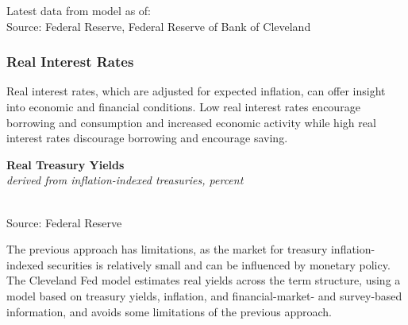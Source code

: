 \documentclass{report}
\newcommand{\tbllink}[1]{\href{https://raw.githubusercontent.com/bdecon/US-chartbook/master/chartbook/data/#1}{\faTable}}
\newcommand{\absnode}[3]{\node[below right, align=left] at (axis cs: #1,#2) {#3};}
\newcommand{\dateaxisticks}{
		date coordinates in=x, axis line style={draw=none},
		xmax={2023-10-01},
		max space between ticks=40,	    
		xtick={{1990-01-01}, {1992-01-01}, {1994-01-01}, 
			{1996-01-01}, {1998-01-01}, {2000-01-01}, 
			{2002-01-01}, {2004-01-01}, {2006-01-01},
			{2008-01-01}, {2010-01-01}, {2012-01-01}, {2014-01-01},
		    {2016-01-01}, {2018-01-01}, {2020-01-01}, {2022-01-01}, 
		    {2024-01-01}, {2026-01-01}},
		minor xtick={{1989-01-01}, {1991-01-01}, {1993-01-01},
			{1995-01-01}, {1997-01-01}, {1999-01-01}, 
			{2001-01-01}, {2003-01-01}, {2005-01-01}, {2007-01-01},
		    {2009-01-01}, {2011-01-01}, {2013-01-01}, {2015-01-01},
		    {2017-01-01}, {2019-01-01}, {2021-01-01}, {2023-01-01}, 
		    {2025-01-01}, {2027-01-01}},
		enlarge y limits={0.06}, enlarge x limits={0.01},
		}
\newcommand{\bbar}[2]{extra #1 ticks = {{#2}}, extra #1 tick labels = ,
		extra #1 tick style = {grid=major, grid style={thick, black!25}},}
\newcommand{\thickline}[4]{\addplot[ultra thick, no markers, color=#1] 
		table [x=#2, y=#3, col sep=comma] {#4};	}
\newcommand{\recbars}{
		\fill[color=black!10] (axis cs:{2007-12-01},\pgfkeysvalueof{/pgfplots/ymin}) rectangle 
			(axis cs:{2009-07-01}, \pgfkeysvalueof{/pgfplots/ymax});
		\fill[color=black!10] (axis cs:{2020-02-01},\pgfkeysvalueof{/pgfplots/ymin}) rectangle 
			(axis cs:{2020-05-01}, \pgfkeysvalueof{/pgfplots/ymax});}
\begin{document}
{\begin{minipage}{0.76\textwidth}
\footnotesize{Latest data from model as of: {}}\\
\footnotesize{Source: Federal Reserve, Federal Reserve of Bank of Cleveland} \hfill \tbllink{inf_exp_ch.csv}
\end{minipage}
\newpage
\begin{minipage}{0.76\textwidth}
\subsubsection*{Real Interest Rates}
\small  Real interest rates, which are adjusted for expected inflation, can offer insight into economic and financial conditions. Low real interest rates encourage borrowing and consumption and increased economic activity while high real interest rates discourage borrowing and encourage saving. 

 
\vspace{2mm} 

\normalsize \textbf{Real Treasury Yields}\\
\footnotesize{\textit{derived from inflation-indexed treasuries, percent}}\\
\hspace*{-2mm} \\
\footnotesize{Source: Federal Reserve} \hfill \tbllink{real_rates.csv}
\vspace{3mm}

\small The previous approach has limitations, as the market for treasury inflation-indexed securities is relatively small and can be influenced by monetary policy. The Cleveland Fed model estimates real yields across the term structure, using a model based on treasury yields, inflation, and financial-market- and survey-based information, and avoids some limitations of the previous approach.


\end{minipage}}
\end{document}
